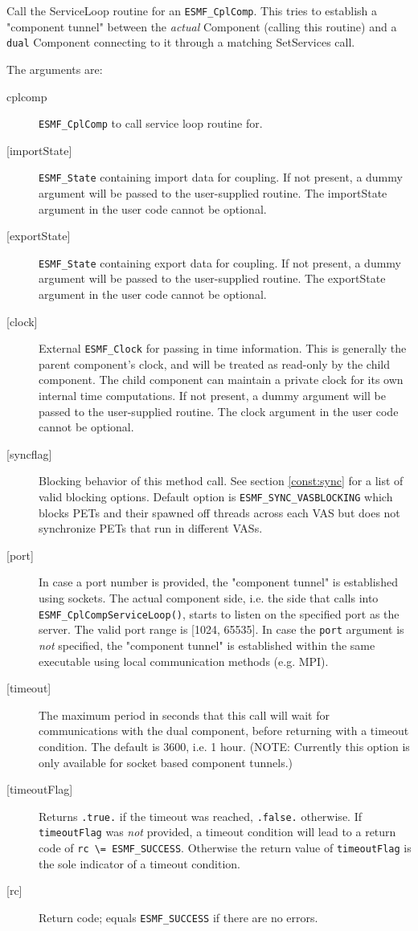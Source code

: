    Call the ServiceLoop routine for an {\tt ESMF\_CplComp}.
   This tries to establish a "component tunnel" between the {\em actual}
   Component (calling this routine) and a {\tt dual} Component connecting to it
   through a matching SetServices call.
  
   The arguments are:
   \begin{description}
   \item[cplcomp]
     {\tt ESMF\_CplComp} to call service loop routine for.
   \item[{[importState]}]
     {\tt ESMF\_State} containing import data for coupling. If not present, a dummy
     argument will be passed to the user-supplied routine.  The
     importState argument in the user code cannot be optional.
   \item[{[exportState]}]
     {\tt ESMF\_State} containing export data for coupling. If not present, a dummy
     argument will be passed to the user-supplied routine.  The
     exportState argument in the user code cannot be optional.
   \item[{[clock]}]
     External {\tt ESMF\_Clock} for passing in time information.
     This is generally the parent component's clock, and will be treated
     as read-only by the child component.  The child component can maintain
     a private clock for its own internal time computations. If not present, a dummy
     argument will be passed to the user-supplied routine.  The
     clock argument in the user code cannot be optional.
   \item[{[syncflag]}]
     Blocking behavior of this method call. See section \ref{const:sync}
     for a list of valid blocking options. Default option is
     {\tt ESMF\_SYNC\_VASBLOCKING} which blocks PETs and their spawned off threads
     across each VAS but does not synchronize PETs that run in different VASs.
   \item[{[port]}]
     In case a port number is provided, the "component tunnel" is established
     using sockets. The actual component side, i.e. the side that calls into
     {\tt ESMF\_CplCompServiceLoop()}, starts to listen on the specified port
     as the server. The valid port range is [1024, 65535].
     In case the {\tt port} argument is {\em not} specified, the "component
     tunnel" is established within the same executable using local communication
     methods (e.g. MPI).
   \item[{[timeout]}]
     The maximum period in seconds that this call will wait for communications
     with the dual component, before returning with a timeout condition.
     The default is 3600, i.e. 1 hour.
     (NOTE: Currently this option is only available for socket based component
     tunnels.)
   \item[{[timeoutFlag]}]
     Returns {\tt .true.} if the timeout was reached, {\tt .false.} otherwise.
     If {\tt timeoutFlag} was {\em not} provided, a timeout condition will lead
     to a return code of {\tt rc \textbackslash = ESMF\_SUCCESS}. Otherwise the
     return value of {\tt timeoutFlag} is the sole indicator of a timeout
     condition.
   \item[{[rc]}]
     Return code; equals {\tt ESMF\_SUCCESS} if there are no errors.
   \end{description}
   
